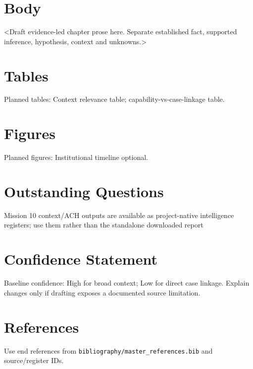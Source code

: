 \section{Body}
<Draft evidence-led chapter prose here. Separate established fact, supported inference, hypothesis, context and unknowns.>

\section{Tables}
Planned tables: Context relevance table; capability-vs-case-linkage table.

\section{Figures}
Planned figures: Institutional timeline optional.

\section{Outstanding Questions}
Mission 10 context/ACH outputs are available as project-native intelligence registers; use them rather than the standalone downloaded report

\section{Confidence Statement}
Baseline confidence: High for broad context; Low for direct case linkage. Explain changes only if drafting exposes a documented source limitation.

\section{References}
Use end references from \texttt{bibliography/master_references.bib} and source/register IDs.
